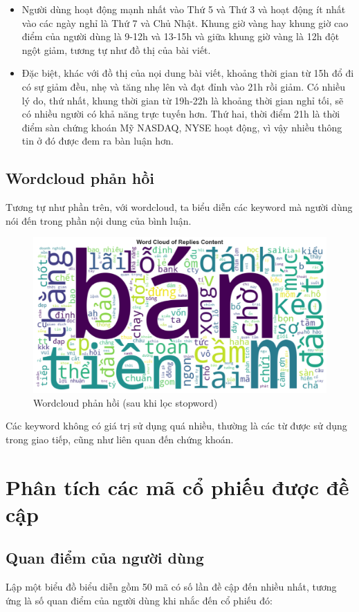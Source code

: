 \begin{itemize}
    \item Người dùng hoạt động mạnh nhất vào Thứ 5 và Thứ 3 và hoạt động ít nhất vào các ngày nghỉ là Thứ 7 và Chủ Nhật. Khung giờ vàng hay khung giờ cao điểm của người dùng là 9-12h và 13-15h và giữa khung giờ vàng là 12h đột ngột giảm, tương tự như đồ thị của bài viết.
    \item Đặc biệt, khác với đồ thị của nọi dung bài viết, khoảng thời gian từ 15h đổ đi có sự giảm đều, nhẹ và tăng nhẹ lên và đạt đỉnh vào 21h rồi giảm. Có nhiều lý do, thứ nhất, khung thời gian từ 19h-22h là khoảng thời gian nghỉ tối, sẽ có nhiều người có khả năng trực tuyến hơn. Thứ hai, thời điểm 21h là thời điểm sàn chứng khoán Mỹ NASDAQ, NYSE hoạt động, vì vậy nhiều thông tin ở đó được đem ra bàn luận hơn.
\end{itemize}

\subsection{Wordcloud phản hồi}
Tương tự như phần trên, với wordcloud, ta biểu diễn các keyword mà người dùng nói đến trong phần nội dung của bình luận. 

\begin{figure}[H]
    \centering
    \includegraphics[width=0.5\linewidth]{images/plot-2.12-wordcloud.png}
    \caption{Wordcloud phản hồi (sau khi lọc stopword)}
    \label{fig:2.10}
\end{figure}
Các keyword không có giá trị sử dụng quá nhiều, thường là các từ được sử dụng trong giao tiếp, cũng như liên quan đến chứng khoán.

\section{Phân tích các mã cổ phiếu được đề cập}

\subsection{Quan điểm của người dùng}
Lập một biểu đồ biểu diễn gồm 50 mã có số lần đề cập đến nhiều nhất, tương ứng là số quan điểm của người dùng khi nhắc đến cổ phiếu đó:

